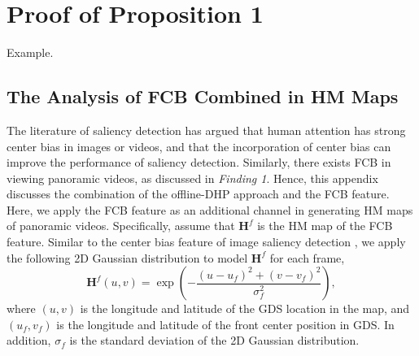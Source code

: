 \documentclass[10pt,journal,compsoc]{IEEEtran}
\begin{document}

%


\appendices
\section{Proof of Proposition 1}

Example.




\subsection{The Analysis of FCB Combined in HM Maps}
The literature of saliency detection \cite{judd2009learning} has argued that human attention has strong center bias in images or videos, and that the incorporation of center bias can improve the performance of saliency detection. Similarly, there exists FCB in viewing panoramic videos, as discussed in \textit{Finding 1}. Hence, this appendix discusses the combination of the offline-DHP approach and the FCB feature. Here, we apply the FCB feature as an additional channel in generating HM maps of panoramic videos. Specifically, assume that $\mathbf{H}^f$ is the HM map of the FCB feature. Similar to the center bias feature of image saliency detection \cite{judd2009learning}, we apply the following 2D Gaussian distribution to model $\mathbf{H}^f$ for each frame,
\begin{equation}
\label{Gauss_sigma}
\mathbf{H}^f(u,v)= \exp\left({-\frac{(u-u_f)^2+(v-v_f)^2}{\sigma_f^2}}\right),
\end{equation}
where $(u,v)$ is the longitude and latitude of the GDS location in the map, and $(u_f,v_f)$ is the longitude and latitude of the front center position in GDS. In addition, $\sigma_f$ is the standard deviation of  the 2D Gaussian distribution.
\end{document}
